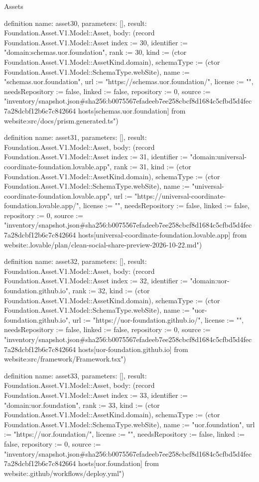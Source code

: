\begin{lexlean}{Assets}
\begin{semanticmodule}
definition{
  name: asset30,
  parameters: [],
  result: Foundation.Asset.V1.Model::Asset,
  body: (record Foundation.Asset.V1.Model::Asset {index := 30, identifier := "domain:schemas.uor.foundation", rank := 30, kind := (ctor Foundation.Asset.V1.Model::AssetKind.domain), schemaType := (ctor Foundation.Asset.V1.Model::SchemaType.webSite), name := "schemas.uor.foundation", url := "https://schemas.uor.foundation/", license := "", needsRepository := false, linked := false, repository := 0, source := "inventory/snapshot.json#sha256:b0075567efadeeb7ee258cbcf8d1684c5cfbd5d4fec7a28dcbf12b6c7c842664 hosts[schemas.uor.foundation] from website:src/docs/prism.generated.ts"})
}

definition{
  name: asset31,
  parameters: [],
  result: Foundation.Asset.V1.Model::Asset,
  body: (record Foundation.Asset.V1.Model::Asset {index := 31, identifier := "domain:universal-coordinate-foundation.lovable.app", rank := 31, kind := (ctor Foundation.Asset.V1.Model::AssetKind.domain), schemaType := (ctor Foundation.Asset.V1.Model::SchemaType.webSite), name := "universal-coordinate-foundation.lovable.app", url := "https://universal-coordinate-foundation.lovable.app/", license := "", needsRepository := false, linked := false, repository := 0, source := "inventory/snapshot.json#sha256:b0075567efadeeb7ee258cbcf8d1684c5cfbd5d4fec7a28dcbf12b6c7c842664 hosts[universal-coordinate-foundation.lovable.app] from website:.lovable/plan/clean-social-share-preview-2026-10-22.md"})
}

definition{
  name: asset32,
  parameters: [],
  result: Foundation.Asset.V1.Model::Asset,
  body: (record Foundation.Asset.V1.Model::Asset {index := 32, identifier := "domain:uor-foundation.github.io", rank := 32, kind := (ctor Foundation.Asset.V1.Model::AssetKind.domain), schemaType := (ctor Foundation.Asset.V1.Model::SchemaType.webSite), name := "uor-foundation.github.io", url := "https://uor-foundation.github.io/", license := "", needsRepository := false, linked := false, repository := 0, source := "inventory/snapshot.json#sha256:b0075567efadeeb7ee258cbcf8d1684c5cfbd5d4fec7a28dcbf12b6c7c842664 hosts[uor-foundation.github.io] from website:src/framework/Framework.tsx"})
}

definition{
  name: asset33,
  parameters: [],
  result: Foundation.Asset.V1.Model::Asset,
  body: (record Foundation.Asset.V1.Model::Asset {index := 33, identifier := "domain:uor.foundation", rank := 33, kind := (ctor Foundation.Asset.V1.Model::AssetKind.domain), schemaType := (ctor Foundation.Asset.V1.Model::SchemaType.webSite), name := "uor.foundation", url := "https://uor.foundation/", license := "", needsRepository := false, linked := false, repository := 0, source := "inventory/snapshot.json#sha256:b0075567efadeeb7ee258cbcf8d1684c5cfbd5d4fec7a28dcbf12b6c7c842664 hosts[uor.foundation] from website:.github/workflows/deploy.yml"})
}


\end{semanticmodule}
\end{lexlean}
